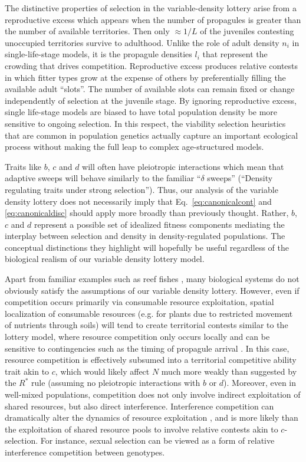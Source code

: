 \documentclass[12pt]{article}
\begin{document}
The distinctive properties of selection in the variable-density lottery arise from a reproductive excess which appears when the number of propagules is greater than the number of available territories. Then only $\approx 1/L$ of the juveniles contesting unoccupied territories survive to adulthood. Unlike the role of adult density $n_i$ in single-life-stage models, it is the propagule densities $l_i$ that represent the crowding that drives competition. Reproductive excess produces relative contests in which fitter types grow at the expense of others by preferentially filling the available adult ``slots''. The number of available slots can remain fixed or change independently of selection at the juvenile stage. By ignoring reproductive excess, single life-stage models are biased to have total population density be more sensitive to ongoing selection. In this respect, the viability selection heuristics that are common in population genetics \cite[pp. 61]{gillespie_2004} actually capture an important ecological process without making the full leap to complex age-structured models.

Traits like $b$, $c$ and $d$ will often have pleiotropic interactions which mean that adaptive sweeps will behave similarly to the familiar ``$\delta$ sweeps'' (``Density regulating traits under strong selection''). Thus, our analysis of the variable density lottery does not necessarily imply that Eq.~\eqref{eq:canonicalcont} and \eqref{eq:canonicaldisc} should apply more broadly than previously thought. Rather, $b$, $c$ and $d$ represent a possible set of idealized fitness components mediating the interplay between selection and density in density-regulated populations. The conceptual distinctions they highlight will hopefully be useful regardless of the biological realism of our variable density lottery model. 

Apart from familiar examples such as reef fishes \citep{chesson_1981}, many biological systems do not obviously satisfy the assumptions of our variable density lottery. However, even if competition occurs primarily via consumable resource exploitation, spatial localization of consumable resources (e.g. for plants due to restricted movement of nutrients through soils) will tend to create territorial contests similar to the lottery model, where resource competition only occurs locally and can be sensitive to contingencies such as the timing of propagule arrival \citep{bolker_99}. In this case, resource competition is effectively subsumed into a territorial competitive ability trait akin to $c$, which would likely affect $N$ much more weakly than suggested by the $R^*$ rule (assuming no pleiotropic interactions with $b$ or $d$). Moreover, even in well-mixed populations, competition does not only involve indirect exploitation of shared resources, but also direct interference. Interference competition can dramatically alter the dynamics of resource exploitation \citep{case_1974,amarasekare_2002}, and is more likely than the exploitation of shared resource pools to involve relative contests akin to $c$-selection. For instance, sexual selection can be viewed as a form of relative interference competition between genotypes. 
\end{document}
